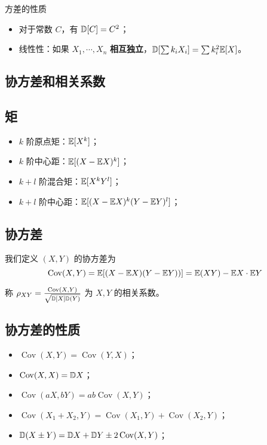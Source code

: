 方差的性质
\begin{itemize}
	\item 对于常数 $C$，有 $\mathbb{D}[C] = C^2$；
	\item 线性性：如果 $X_1, \cdots, X_n$ \textbf{相互独立}，$\mathbb{D}[\sum k_iX_i] = \sum k_i^2 \mathbb{E} [X]$。
\end{itemize}

\subsection{协方差和相关系数}

\subsection*{矩}
\begin{itemize}
	\item $k$ 阶原点矩：$\mathbb{E}[X^k]$；
	\item $k$ 阶中心距：$\mathbb{E}[(X - \mathbb{E} X)^k]$；
	\item $k + l$ 阶混合矩：$\mathbb{E}[X^k Y^l]$；
	\item $k + l$ 阶中心距：$\mathbb{E}[(X - \mathbb{E} X)^k (Y - \mathbb{E} Y)^l]$；
\end{itemize}

\subsection*{协方差}

\newcommand{\opCov}{\operatorname{Cov}}

我们定义 $(X, Y)$ 的协方差为
\[ \opCov(X, Y) = \bbE[(X - \bbE X)(Y - \bbE Y))] = \bbE(XY) - \bbE X \cdot \bbE Y \]

称 $\rho_{XY} = \frac{\opCov(X, Y)}{\sqrt{\bbD [X] \bbD(Y)}}$ 为 $X, Y$ 的相关系数。



\subsection*{协方差的性质}

\begin{itemize}
	\item $\opCov(X, Y) = \opCov(Y, X)$；
	\item $\opCov(X, X) = \bbD X$；
	\item $\opCov(aX, bY) = ab \opCov(X, Y)$；
	\item $\opCov(X_1 + X_2, Y) = \opCov(X_1, Y) + \opCov(X_2, Y)$；
	\item $\bbD(X \pm Y) = \bbD X + \bbD Y \pm 2 \opCov(X, Y)$；
\end{itemize}


